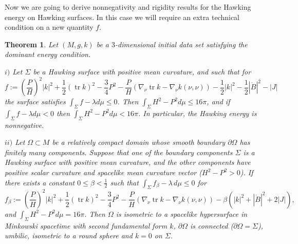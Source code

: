 \documentclass[12pt,a4paper]{amsart}
\theoremstyle{plain}
\newtheorem{theorem}{Theorem}[section]
\theoremstyle{definition}
\newcommand{\tr}{\operatorname{tr}}
\begin{document}
Now we are going to derive nonnegativity and rigidity results for the Hawking energy on Hawking surfaces. In this case we will require an extra technical condition on a new quantity $f$.
\begin{theorem}\label{positivity0}
    Let $(M,g,k)$ be a $3$-dimensional initial data set satisfying the dominant energy condition.
    
    $i)$ Let $\Sigma$ be a Hawking surface with positive mean curvature, and such that for 
   $$ f:= \left( \frac{P}{H}\right)^2|k|^2+ \frac{1}{2 }(\tr k)^2    - \frac{3}{4} P^2- \frac{P}{H}( \nabla_\nu \tr k - \nabla_\nu k(\nu,\nu )) -  \frac{1}{2} |k|^2  -\frac{1}{2} |\mathring{B}|^2 -|J|$$
    the surface satisfies $\int_\Sigma f -\lambda d\mu \leq 0$. Then $\int_\Sigma H^2 -P^2 d\mu \leq 16\pi $, and  if $\int_\Sigma f -\lambda d\mu < 0$ then  $\int_\Sigma H^2 -P^2 d\mu < 16\pi $. In particular, the Hawking energy is nonnegative.



 $ii)$ Let  $\Omega \subset M$ be a relatively compact domain whose smooth boundary  $\partial \Omega $  has finitely many components. Suppose that one of the boundary components $\Sigma$ is a Hawking surface with positive mean curvature, and the other components have positive scalar curvature and spacelike mean curvature vector ($H^2-P^2>0$). If   there exists a constant $0\leq\beta <\frac{1}{2}$ such that $\int_\Sigma f_\beta -\lambda \, d\mu \leq 0$  for 
       $$ f_\beta:= \left( \frac{P}{H}\right)^2|k|^2+ \frac{1}{2 }(\tr k)^2   - \frac{3}{4} P^2- \frac{P}{H}( \nabla_\nu \tr k - \nabla_\nu k(\nu,\nu ))  -  \beta( |k|^2 + |\mathring{B}|^2 +2|J|), $$
and  $\int_\Sigma H^2 -P^2 d\mu = 16\pi $. Then   $\Omega$ is isometric to a spacelike hypersurface in Minkowski
spacetime with second fundamental form  $k$,   $\partial \Omega$ is connected ($ \partial \Omega=\Sigma $), umbilic,  isometric to a round sphere and $k=0$ on $\Sigma$.
\end{theorem}
\end{document}
